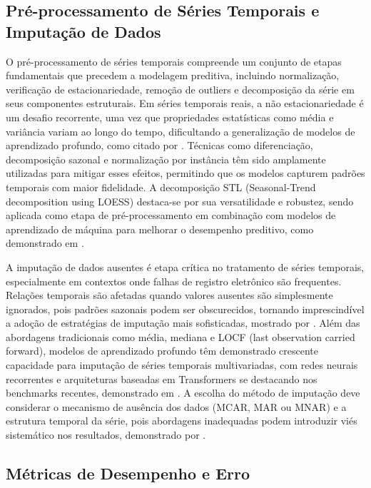 \documentclass[
    12pt,                %
    openright,           %
    oneside,             %
    a4paper,             %
    english,             %
    brazil               %
]{abntex2}
\begin{document}
\subsection{Pré-processamento de Séries Temporais e Imputação de Dados}
\label{subsec:preprocessamento}

O pré-processamento de séries temporais compreende um conjunto de etapas fundamentais que precedem a modelagem preditiva, incluindo normalização, verificação de estacionariedade, remoção de outliers e decomposição da série em seus componentes estruturais. Em séries temporais reais, a não estacionariedade é um desafio recorrente, uma vez que propriedades estatísticas como média e variância variam ao longo do tempo, dificultando a generalização de modelos de aprendizado profundo, como citado por . Técnicas como diferenciação, decomposição sazonal e normalização por instância têm sido amplamente utilizadas para mitigar esses efeitos, permitindo que os modelos capturem padrões temporais com maior fidelidade. A decomposição STL (Seasonal-Trend decomposition using LOESS) destaca-se por sua versatilidade e robustez, sendo aplicada como etapa de pré-processamento em combinação com modelos de aprendizado de máquina para melhorar o desempenho preditivo, como demonstrado em .

A imputação de dados ausentes é etapa crítica no tratamento de séries temporais, especialmente em contextos onde falhas de registro eletrônico são frequentes. Relações temporais são afetadas quando valores ausentes são simplesmente ignorados, pois padrões sazonais podem ser obscurecidos, tornando imprescindível a adoção de estratégias de imputação mais sofisticadas, mostrado por . Além das abordagens tradicionais como média, mediana e LOCF (last observation carried forward), modelos de aprendizado profundo têm demonstrado crescente capacidade para imputação de séries temporais multivariadas, com redes neurais recorrentes e arquiteturas baseadas em Transformers se destacando nos benchmarks recentes, demonstrado em . A escolha do método de imputação deve considerar o mecanismo de ausência dos dados (MCAR, MAR ou MNAR) e a estrutura temporal da série, pois abordagens inadequadas podem introduzir viés sistemático nos resultados, demonstrado por .

\subsection{Métricas de Desempenho e Erro}
\label{subsec:metricas}
\end{document}
